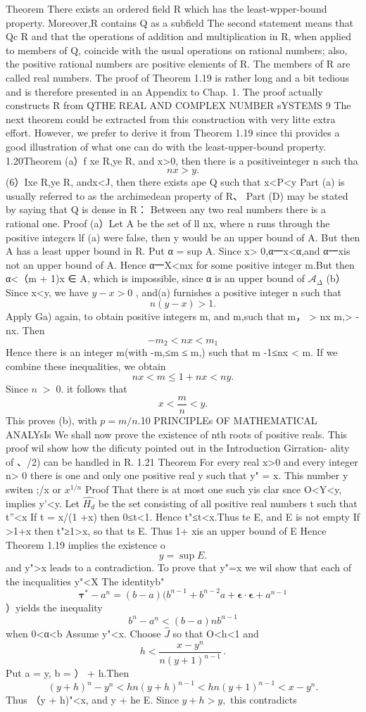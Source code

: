 Theorem There exists an ordered field R which has the least-wpper-bound property. Moreover,R contains Q as a subfield The second statement means that Qc R and that the operations of addition and multiplication in R, when applied to members of Q, coincide with the usual operations on rational numbers; also, the positive rational numbers are positive elements of R. The members of R are called real numbers. The proof of Theorem 1.19 is rather long and a bit tedious and is therefore presented in an Appendix to Chap. 1. The proof actually constructs R from QTHE REAL AND COMPLEX NUMBER sYSTEMS 9 The next theorem could be extracted from this construction with very litte extra effort. However, we prefer to derive it from Theorem 1.19 since thi provides a good illustration of what one can do with the least-upper-bound property. 1.20Theorem (a）f xe R,ye R, and x>0, then there is a positiveinteger n such tha $$ n x>y. $$ (6）Ixe R,ye R, andx<J, then there exists ape Q such that x<P<y Part (a) is usually referred to as the archimedean property of R、 Part (D) may be stated by saying that Q is dense in R： Between any two real numbers there is a rational one. Proof (a）Let A be the set of ll nx, where n runs through the positive integcrs lf (a) were false, then y would be an upper bound of A. But then A has a least upper bound in R. Put α = sup A. Since x> 0,α一x<α,and α一xis not an upper bound of A. Hence α一X<mx for some positive integer m.But then α<（m + 1)x ∈ A, which is impossible, since α is an upper bound of ${\mathcal{A}}_{\Delta}$ (b）Since x<y, we have $y-x>0$ , and(a) furnishes a positive integer n such that $$ n(y-x)>1. $$ Apply Ga) again, to obtain positive integers m, and m,such that m， > nx m,> -nx. Then $$ -m_{2}<n x<m_{1} $$ Hence there is an integer m(with -m,≤m ≤ m,) such that m -1≤nx < m. If we combine these inequalities, we obtain $$ n x<m\leq1+n x<n y. $$ Since $\scriptstyle n\;>\;0.$ it follows that $$ x<{\frac{m}{n}}<y. $$ This proves (b), with $p=m/n.$10 PRINCIPLEs OF MATHEMATICAL ANALYsIs We shall now prove the existence of nth roots of positive reals. This proof wil show how the dificuty pointed out in the Introduction Girration- ality of 、/2) can be handled in R. 1.21 Theorem For every real x>0 and every integer n> 0 there is one and only one positive real y such that y" = x. This number y switen ;/x or $x^{1/n}$ Proof That there is at most one such yis clar snce O<Y<y, implies y'<y. Let $\widehat{H_{d}}$ be the set consisting of all positive real numbers t such that t”<x If t = x/(1 +x) then 0≤t<1. Hence t"≤t<x.Thus te E, and E is not empty If >1+x then t"≥1>x, so that ts E. Thus 1+ xis an upper bound of E Hence Theorem 1.19 implies the existence o $$ y=\operatorname*{sup}E. $$ and y">x leads to a contradiction. To prove that y"=x we wil show that each of the incqualities y"<X The identityb" $$ \mathbf{\tau}^{*}-a^{n}=(b-a)(b^{n-1}+b^{n-2}a+\mathbf{\epsilon}\cdot\mathbf{\epsilon}+a^{n-1} $$ ）yields the inequality $$ b^{n}-a^{n}<(b-a)n b^{n-1} $$ when 0<α<b Assume y"<x. Choose $\textstyle{\hat{J}}$ so that O<h<1 and $$ h<{\frac{x-y^{n}}{n(y+1)^{n-1}}}\,. $$ Put a = y, b = ） + h.Then $$ (y+h)^{n}-y^{n}<h n(y+h)^{n-1}<h n(y+1)^{n-1}<x-y^{n}. $$ Thus （y + h)"<x, and y + he E. Since $y+h>y,$ this contradicts 